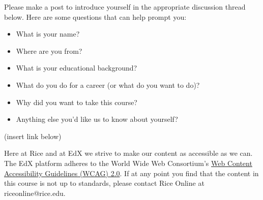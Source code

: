 \endedxvertical




Please make a post to introduce yourself in the appropriate discussion thread below.  Here are some questions that can help prompt you:

\begin{itemize}
\item
What is your name?
\item
Where are you from?  
\item
What is your educational background?  
\item
What do you do for a career (or what do you want to do)? 

\item
 Why did you want to take this course? 
 
\item
 Anything else you'd like us to know about yourself?  
\end{itemize}

(insert link below)

\endedxtext



\endedxvertical





Here at Rice and at EdX we strive to make our content as accessible as we can. The EdX platform adheres to the World Wide Web Consortium's \href{https://www.w3.org/TR/WCAG/}{Web Content Accessibility Guidelines (WCAG) 2.0}. If at any point you find that the content in this course is not up to standards, please contact Rice Online at riceonline@rice.edu.




\endedxtext



\endedxvertical
